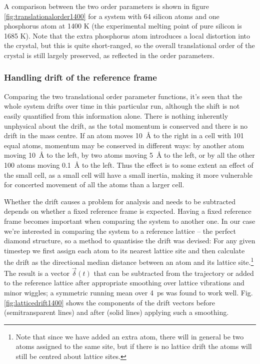 \documentclass[11pt,bibliography=totoc,index=totoc]{scrbook}   %
\begin{document}
A comparison between the two order parameters is shown in figure \ref{fig:translationalorder1400} for a system
with 64 silicon atoms and one phosphorus atom at 1400 K (the experimental melting point of pure silicon is 1685 K).
Note that the extra phosphorus atom introduces a local distortion into the crystal, but this is quite short-ranged,
so the overall translational order of the crystal is still largely preserved, as reflected in the order parameters.

\subsubsection{Handling drift of the reference frame}

Comparing the two translational order parameter functions, it's seen that the whole system drifts over time in this particular run, although the shift is not easily quantified from this information alone. 
There is nothing inherently unphysical about the drift, as the total momentum is conserved and there is no drift in the mass centre.
If an atom moves 10~Å to the right in a cell with 101 equal atoms, momentum may be conserved in different ways: by another atom moving 10~Å to the left, by two atoms moving 5~Å to the left, or by all the other 100 atoms moving 0.1~Å to the left.
Thus the effect is to some extent an effect of the small cell, as a small cell will have a small inertia, making it more vulnerable for concerted movement of all the atoms than a larger cell.

Whether the drift causes a problem for analysis and needs to be subtracted depends on whether a fixed reference frame is expected. 
Having a fixed reference frame becomes important when comparing the system to another one. 
In our case we're interested in comparing the system to a reference lattice – the perfect diamond structure, so a method to quantisise the drift was devised:
For any given timestep we first assign each atom to its nearest lattice site and then calculate the drift as the directional median distance between an atom and its lattice site.\footnote{Note that since we have added an extra atom, there will in general be two atoms assigned to the same site, but if there is no lattice drift the atoms will still be centred about lattice sites.}
The result is a vector $\vec{\delta}(t)$ that can be subtracted from the trajectory or added to the reference lattice after appropriate smoothing over lattice vibrations and minor wiggles; a symmetric running mean over 4~ps was found to work well.
Fig. \ref{fig:latticedrift1400} shows the components of the drift vectors before (semitransparent lines) and after (solid lines) applying such a smoothing.
\end{document}
